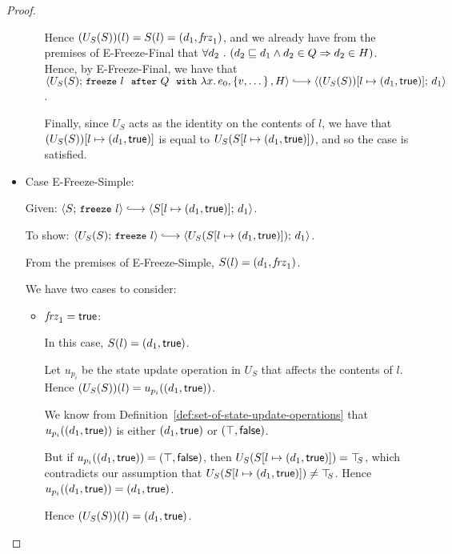 \begin{proof}
\begin{itemize}
\begin{itemize}
          Hence $(U_S(S))(l) = S(l) = (d_1, \mathit{frz}_1)$, and we
          already have from the premises of {\sc E-Freeze-Final} that
          $\forall{d_2} ~.~ ( {d_2 \sqsubseteq d_1 \land d_2 \in Q}
          \Rightarrow d_2 \in H)$.  Hence, by {\sc E-Freeze-Final}, we
          have that
          $\config{U_S(S)}{\freezeafterfull{l}{Q}{\lam{x}{e_0}}{\setof{v,
                \dots}}{H}} \parstepsto
          \config{\extS{(U_S(S))}{l}{d_1}{\frozentrue}}{d_1}$.

          Finally, since $U_S$ acts as the identity on the contents of
          $l$, we have that $(U_S(S))[l \mapsto (d_1, \textsf{true})]$ is
          equal to $U_S(S[l \mapsto (d_1, \textsf{true})])$, and so the
          case is satisfied.
      \end{itemize}

    \item Case {\sc E-Freeze-Simple}:

      Given: $\config{S}{\freeze{l}} \parstepsto
      \config{\extS{S}{l}{d_1}{\frozentrue}}{d_1}$.

      To show: $\config{U_S(S)}{\freeze{l}} \parstepsto
      \config{U_S(\extS{S}{l}{d_1}{\frozentrue})}{d_1}$.

      From the premises of {\sc E-Freeze-Simple}, $S(l) =
      (d_1, \mathit{frz}_1)$.

      We have two cases to consider:
      \begin{itemize}
        \item $\mathit{frz}_1 = \textsf{true}$:

          In this case, $S(l) = (d_1, \textsf{true})$.

          Let $u_{p_i}$ be the state update operation in $U_S$ that
          affects the contents of $l$.  Hence $(U_S(S))(l) =
          u_{p_i}((d_1, \textsf{true}))$.

          We know from
          Definition~\ref{def:set-of-state-update-operations} that
          $u_{p_i}((d_1, \textsf{true}))$ is either
          $(d_1, \textsf{true})$ or $(\top, \textsf{false})$.

          But if $u_{p_i}((d_1, \textsf{true})) =
          (\top, \textsf{false})$, then
          $U_S(S[l \mapsto (d_1, \textsf{true})]) = \top\hspace{-0.85mm}_{S}$, which
          contradicts our assumption that
          $U_S(S[l \mapsto (d_1, \textsf{true})]) \neq \top\hspace{-0.85mm}_{S}$.  Hence
          $u_{p_i}((d_1, \textsf{true})) =
          (d_1, \textsf{true})$.

          Hence $(U_S(S))(l) = (d_1, \textsf{true})$.


\end{itemize}
\end{itemize}
\end{proof}
